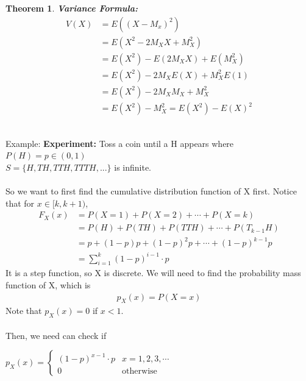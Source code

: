 \documentclass[11pt,oneside]{book}
\theoremstyle{break}
\theoremstyle{break}
\newtheorem{thm}{Theorem}[section]
\newcommand{\example}{\color{WildStrawberry}Example: \color{black}}
\begin{document}
\begin{thm}
\textbf{Variance Formula:} \begin{align*}
V(X)&=E((X-M_x)^2)\\
&=E(X^2-2M_XX+M_X^2)\\
&=E(X^2)-E(2M_XX)+E(M_X^2)\\
&=E(X^2)-2M_XE(X)+M_X^2E(1)\\
&=E(X^2)-2M_XM_X+M_X^2\\
&=E(X^2)-M_X^2
=E(X^2)-E(X)^2
\end{align*}
\end{thm}
\hfill\\
\example \textbf{Experiment:} Toss a coin until a H appears where $P(H)=p\in (0,1)$\\
\text{\qquad}\text{\qquad} $S=\{H,TH,TTH,TTTH,...\}$ is infinite.\\
\hfill\\
So we want to first find the cumulative distribution function of X first. Notice that for $x\in [k,k+1)$, \begin{align*}
F_X(x)&=P(X=1)+P(X=2)+\cdots+P(X=k)\\
&=P(H)+P(TH)+P(TTH)+\cdots +P(T_{k-1}H)\\
&=p+(1-p)p+(1-p)^2p+\cdots+(1-p)^{k-1}p\\
&=\sum_{i=1}^{k}(1-p)^{i-1}\cdot p
\end{align*}
It is a step function, so X is discrete. We will need to find the probability mass function of X, which is \begin{align*}
p_X(x)=P(X=x)
\end{align*}
Note that $p_X(x)=0$ if $x<1$.\\
\hfill\\
Then, we need can check if \begin{center}
$p_X(x)=\begin{cases} (1-p)^{x-1}\cdot p &x=1,2,3,\cdots \\
0 &\text{otherwise} \end{cases}$
\end{center}
\end{document}
